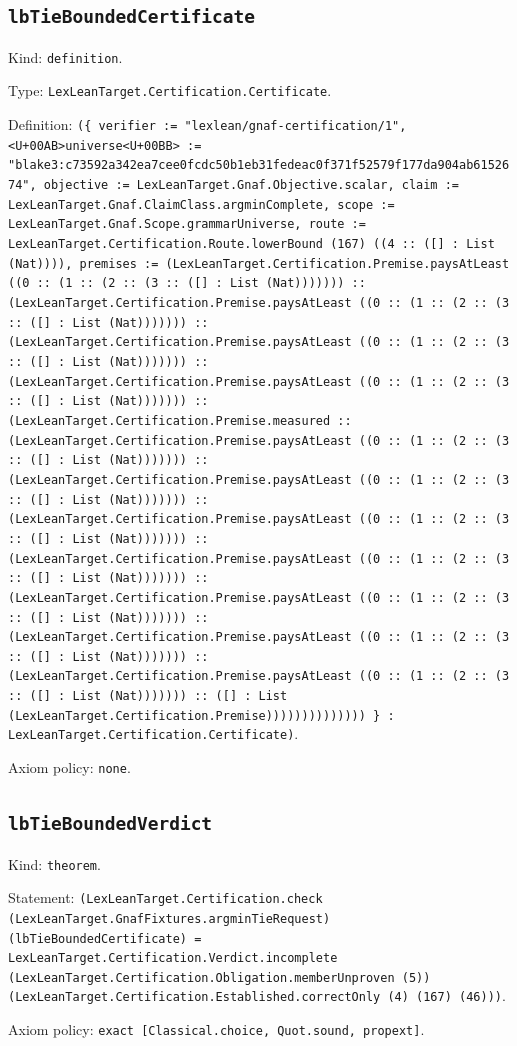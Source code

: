 \documentclass[11pt]{article}
\begin{document}
\subsection*{\texttt{lbTieBoundedCertificate}}
\noindent Kind: \texttt{definition}.\par
\noindent Type: \texttt{LexLeanTarget.Certification.Certificate}.\par
\noindent Definition: \texttt{(\{ verifier := "lexlean/gnaf-certification/1", <U+00AB>universe<U+00BB> := "blake3:c73592a342ea7cee0fcdc50b1eb31fedeac0f371f52579f177da904ab6152674", objective := LexLeanTarget.Gnaf.Objective.scalar, claim := LexLeanTarget.Gnaf.ClaimClass.argminComplete, scope := LexLeanTarget.Gnaf.Scope.grammarUniverse, route := LexLeanTarget.Certification.Route.lowerBound (167) ((4 :: ([] : List (Nat)))), premises := (LexLeanTarget.Certification.Premise.paysAtLeast ((0 :: (1 :: (2 :: (3 :: ([] : List (Nat))))))) :: (LexLeanTarget.Certification.Premise.paysAtLeast ((0 :: (1 :: (2 :: (3 :: ([] : List (Nat))))))) :: (LexLeanTarget.Certification.Premise.paysAtLeast ((0 :: (1 :: (2 :: (3 :: ([] : List (Nat))))))) :: (LexLeanTarget.Certification.Premise.paysAtLeast ((0 :: (1 :: (2 :: (3 :: ([] : List (Nat))))))) :: (LexLeanTarget.Certification.Premise.measured :: (LexLeanTarget.Certification.Premise.paysAtLeast ((0 :: (1 :: (2 :: (3 :: ([] : List (Nat))))))) :: (LexLeanTarget.Certification.Premise.paysAtLeast ((0 :: (1 :: (2 :: (3 :: ([] : List (Nat))))))) :: (LexLeanTarget.Certification.Premise.paysAtLeast ((0 :: (1 :: (2 :: (3 :: ([] : List (Nat))))))) :: (LexLeanTarget.Certification.Premise.paysAtLeast ((0 :: (1 :: (2 :: (3 :: ([] : List (Nat))))))) :: (LexLeanTarget.Certification.Premise.paysAtLeast ((0 :: (1 :: (2 :: (3 :: ([] : List (Nat))))))) :: (LexLeanTarget.Certification.Premise.paysAtLeast ((0 :: (1 :: (2 :: (3 :: ([] : List (Nat))))))) :: (LexLeanTarget.Certification.Premise.paysAtLeast ((0 :: (1 :: (2 :: (3 :: ([] : List (Nat))))))) :: ([] : List (LexLeanTarget.Certification.Premise)))))))))))))) \} : LexLeanTarget.Certification.Certificate)}.\par
\noindent Axiom policy: \texttt{none}.\par
\subsection*{\texttt{lbTieBoundedVerdict}}
\noindent Kind: \texttt{theorem}.\par
\noindent Statement: \texttt{(LexLeanTarget.Certification.check (LexLeanTarget.GnafFixtures.argminTieRequest) (lbTieBoundedCertificate) = LexLeanTarget.Certification.Verdict.incomplete (LexLeanTarget.Certification.Obligation.memberUnproven (5)) (LexLeanTarget.Certification.Established.correctOnly (4) (167) (46)))}.\par
\noindent Axiom policy: \texttt{exact [Classical.choice, Quot.sound, propext]}.\par
\end{document}
